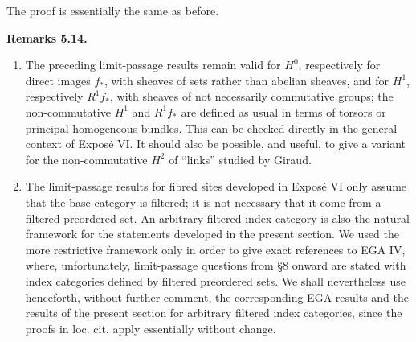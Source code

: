 \documentclass[11pt]{article}
\newcommand{\EGA}{EGA}
\newcommand{\loccit}{loc. cit.}
\newenvironment{remarktext}[1]{\par\medskip\noindent\textbf{#1.}\ }{\par\medskip}
\begin{document}
The proof is essentially the same as before.

\begin{remarktext}{Remarks 5.14}
\begin{enumerate}[label=\alph*)]
\item The preceding limit-passage results remain valid for \(H^0\), respectively for direct images \(f_*\), with sheaves of sets rather than abelian sheaves, and for \(H^1\), respectively \(R^1f_*\), with sheaves of not necessarily commutative groups; the non-commutative \(H^1\) and \(R^1f_*\) are defined as usual in terms of torsors or principal homogeneous bundles. This can be checked directly in the general context of Expos\'e VI. It should also be possible, and useful, to give a variant for the non-commutative \(H^2\) of ``links'' studied by Giraud.

\item The limit-passage results for fibred sites developed in Expos\'e VI only assume that the base category is filtered; it is not necessary that it come from a filtered preordered set. An arbitrary filtered index category is also the natural framework for the statements developed in the present section. We used the more restrictive framework only in order to give exact references to \EGA{} IV, where, unfortunately, limit-passage questions from §8 onward are stated with index categories defined by filtered preordered sets. We shall nevertheless use henceforth, without further comment, the corresponding \EGA{} results and the results of the present section for arbitrary filtered index categories, since the proofs in \loccit{} apply essentially without change.
\end{enumerate}
\end{remarktext}
\end{document}
